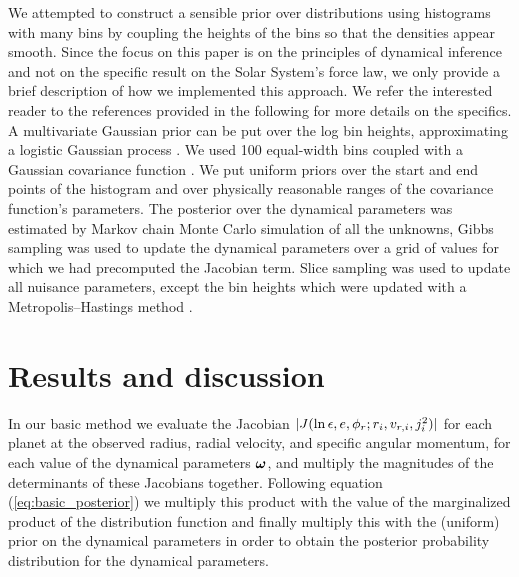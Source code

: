 We attempted to construct a sensible prior over distributions using
histograms with many bins by coupling the heights of the bins so that
the densities appear smooth. Since the focus on this paper is on the
principles of dynamical inference and not on the specific result on
the Solar System's force law, we only provide a brief description of
how we implemented this approach. We refer the interested reader to
the references provided in the following for more details on the
specifics. A multivariate Gaussian prior can be put over the log bin
heights, approximating a logistic Gaussian process
\citep{leonard1978}. We used 100 equal-width bins coupled with a
Gaussian covariance function \citep{rasmussen2005a}. We put uniform
priors over the start and end points of the histogram and over
physically reasonable ranges of the covariance function's parameters.
The posterior over the dynamical parameters was estimated by Markov
chain Monte Carlo simulation of all the unknowns, Gibbs sampling was
used to update the dynamical parameters over a grid of values for
which we had precomputed the Jacobian term. Slice sampling
\citep{neal2003a} was used to update all nuisance parameters, except
the bin heights which were updated with a Metropolis--Hastings method
\citep[Eq.~15]{neal1999a}.

\section{Results and discussion}

In our basic method we evaluate the Jacobian $|J(\ln
\epsilon,e,\phi_r;r_i,v_{r,i},j_i^2)|$ for each planet at the
observed radius, radial velocity, and specific angular momentum, for
each value of the dynamical parameters $\boldsymbol{{\omega}}$, and multiply the
magnitudes of the determinants of these Jacobians together. Following
equation (\ref{eq:basic_posterior}) we multiply this product with the
value of the marginalized product of the distribution function and
finally multiply this with the (uniform) prior on the dynamical
parameters in order to obtain the posterior probability distribution
for the dynamical parameters.

